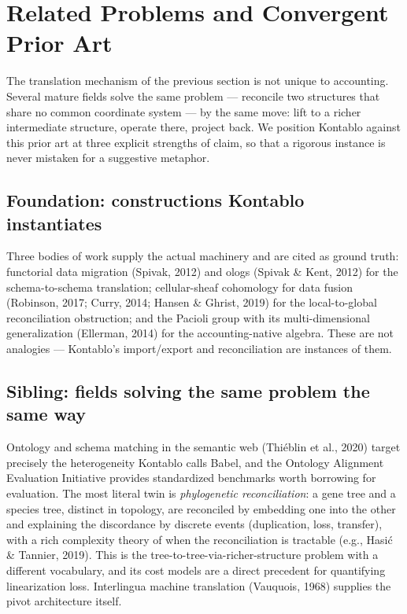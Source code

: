 \section{Related Problems and Convergent Prior Art}

The translation mechanism of the previous section is not unique to accounting. Several
mature fields solve the same problem --- reconcile two structures that share no common
coordinate system --- by the same move: lift to a richer intermediate structure, operate
there, project back. We position Kontablo against this prior art at three explicit strengths
of claim, so that a rigorous instance is never mistaken for a suggestive metaphor.

\subsection{Foundation: constructions Kontablo instantiates}
Three bodies of work supply the actual machinery and are cited as ground truth: functorial
data migration (Spivak, 2012) and ologs (Spivak \& Kent, 2012) for the schema-to-schema
translation; cellular-sheaf cohomology for data fusion (Robinson, 2017; Curry, 2014;
Hansen \& Ghrist, 2019) for the local-to-global reconciliation obstruction; and the Pacioli
group with its multi-dimensional generalization (Ellerman, 2014) for the accounting-native
algebra. These are not analogies --- Kontablo's import/export and reconciliation are
instances of them.

\subsection{Sibling: fields solving the same problem the same way}
Ontology and schema matching in the semantic web (Thiéblin et al., 2020) target precisely
the heterogeneity Kontablo calls Babel, and the Ontology Alignment Evaluation Initiative
provides standardized benchmarks worth borrowing for evaluation. The most literal twin is
\emph{phylogenetic reconciliation}: a gene tree and a species tree, distinct in topology, are
reconciled by embedding one into the other and explaining the discordance by discrete events
(duplication, loss, transfer), with a rich complexity theory of when the reconciliation is
tractable (e.g., Hasić \& Tannier, 2019). This is the tree-to-tree-via-richer-structure
problem with a different vocabulary, and its cost models are a direct precedent for
quantifying linearization loss. Interlingua machine translation (Vauquois, 1968) supplies the
pivot architecture itself.

